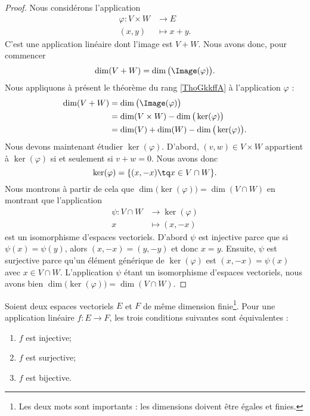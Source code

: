 \begin{proof}
	Nous considérons l'application
	\begin{equation}
		\begin{aligned}
			\varphi\colon V\times W & \to E       \\
			(x,y)                   & \mapsto x+y.
		\end{aligned}
	\end{equation}
	C'est une application linéaire dont l'image est \( V+W\). Nous avons donc, pour commencer
	\begin{equation}
		\dim(V+W)=\dim\big( \Image(\varphi) \big).
	\end{equation}
	Nous appliquons à présent le théorème du rang \ref{ThoGkkffA} à l'application \( \varphi\) :
	\begin{subequations}
		\begin{align}
			\dim(V+W) & =\dim\big( \Image(\varphi) \big)                \\
			          & =\dim(V\times W)- \dim\big( \ker(\varphi) \big) \\
			          & =\dim(V)+\dim(W)-\dim\big( \ker(\varphi) \big).
		\end{align}
	\end{subequations}
	Nous devons maintenant étudier \( \ker(\varphi)\). D'abord, \( (v,w)\in V\times W\) appartient à \( \ker(\varphi)\) si et seulement si \( v+w=0\). Nous avons donc
	\begin{equation}
		\ker(\varphi)=\{ (x,-x)\tq x\in V\cap W \}.
	\end{equation}
	Nous montrons à partir de cela que \( \dim\big( \ker(\varphi) \big)=\dim(V\cap W)\) en montrant que l'application
	\begin{equation}
		\begin{aligned}
			\psi\colon V\cap W & \to \ker(\varphi) \\
			x                  & \mapsto (x,-x)
		\end{aligned}
	\end{equation}
	est un isomorphisme d'espaces vectoriels. D'abord \( \psi\) est injective parce que si \( \psi(x)=\psi(y)\), alors \( (x,-x)=(y,-y)\) et donc \( x=y\). Ensuite, \( \psi\) est surjective parce qu'un élément générique de \( \ker(\varphi)\) est \( (x,-x)=\psi(x)\) avec \( x\in V\cap W\). L'application \( \psi\) étant un isomorphisme d'espaces vectoriels, nous avons bien \( \dim\big( \ker(\varphi) \big)=\dim(V\cap W)\).
\end{proof}

\begin{corollary}       \label{CORooCCXHooALmxKk}
	Soient deux espaces vectoriels \( E\) et \( F\) de même dimension finie\footnote{Les deux mots sont importants : les dimensions doivent être égales et finies.}. Pour une application linéaire \( f\colon E\to F\), les trois conditions suivantes sont équivalentes :
	\begin{enumerate}
		\item
		      \( f\) est injective;
		\item
		      \( f\) est surjective;
		\item
		      \( f\) est bijective.
	\end{enumerate}
\end{corollary}

